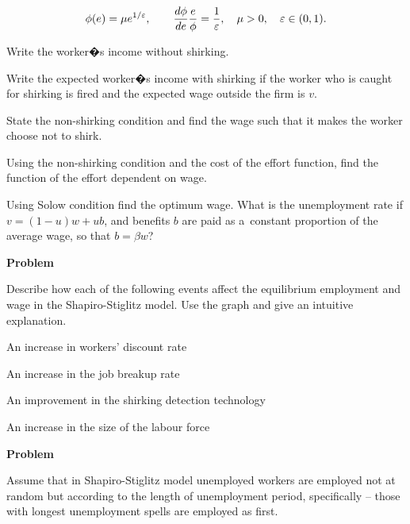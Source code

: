 \documentclass[a4paper, notitlepage, 11pt]{article}
\newcounter{zadlicz}[section]%
\newcommand{\tytul}[2]{\setcounter{equation}{0}\addtocounter{zadlicz}{1}\vspace{\abovedisplayskip}\noindent\textbf{#1\ \thezadlicz #2}}%
\begin{document}
\begin{equation}
\phi(e)=\mu e^{1/\varepsilon},\qquad \frac{d\phi}{de}\frac{e}{\phi}=\frac{1}{\varepsilon},\quad \mu>0,\quad \varepsilon\in (0,1).\label{phi}\notag
\end{equation}

\begin{wylicz}
\item Write the worker�s income without shirking.
\item Write the expected worker�s income with shirking if the worker who is caught for shirking is fired and the expected wage outside the firm is $v$.
\item State the non-shirking condition and find the wage such that it makes the worker choose not to shirk.
\item Using the non-shirking condition and the cost of the effort function, find the function of the effort dependent on wage.
\item Using Solow condition find the optimum wage. What is the unemployment rate if $v=(1-u)w+ub$, and benefits $b$ are paid as a~constant proportion of the average wage, so that $b=\beta w$?
\end{wylicz}

\tytul{Problem}{}

\noindent%
Describe how each of the following events affect the equilibrium employment and wage in the Shapiro-Stiglitz model. Use the graph and give an intuitive explanation.

\begin{wylicz}
 \item An increase in workers' discount rate
 \item An increase in the job breakup rate
 \item An improvement in the shirking detection technology
 \item An increase in the size of the labour force
\end{wylicz}

\tytul{Problem}{}

\noindent%
Assume that in Shapiro-Stiglitz model unemployed workers are employed not at random but according to the length of unemployment period, specifically -- those with longest unemployment spells are employed as first.
\end{document}
